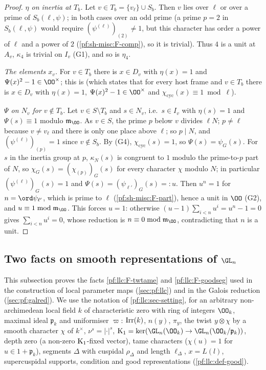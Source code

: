 \begin{proof}
\emph{$\eta$ on inertia at $T_b$.} Let $v\in T_b=\{v_\ell\}\cup S_b$. Then $v$ lies over $\ell$ or over a prime of $S_b(\ell,\psi)$; in both cases
over an odd prime (a prime $p=2$ in $S_b(\ell,\psi)$ would require $(\psi^{(\ell)})_{(2)}\ne1$, but this character has order a power of
$\ell$ and a power of $2$ (\ref{pf:sh-misc:F-comp}), so it is trivial). Thus $4$ is a unit at $A_v$, $\kappa_4$ is trivial on $I_v$ (G1),
and so is $\eta_4$.

\emph{The elements $x_v$.} For $v\in T_b$ there is $x\in D_v$ with $\eta(x)=1$ and $\Psi(x)^2-1\in\OO^\times$; this is
 (which states that for every host frame and $v\in T_b$ there is $x\in D_v$ with
$\eta(x)=1$, $\Psi(x)^2-1\in\OO^\times$ and $\chi_{\mathrm{cyc}}(x)\equiv1\bmod\ell$).

\emph{$\Psi$ on $N_v$ for $v\notin T_b$.} Let $v\in S\setminus T_b$ and $s\in N_v$, i.e.\ $s\in I_v$ with $\eta(s)=1$ and $\Psi(s)\equiv1$ modulo
$\mathfrak m_\OO$. As $v\in S$, the prime $p$ below $v$ divides $\ell N$; $p\ne\ell$ because $v\ne v_\ell$ and there is only one place above $\ell$;
so $p\mid N$, and $(\psi^{(\ell)})_{(p)}=1$ since $v\notin S_b$. By (G4), $\chi_{\mathrm{cyc}}(s)=1$, so $\Psi(s)=\psi_G(s)$. For $s$ in the inertia
group at $p$, $\kappa_N(s)$ is congruent to $1$ modulo the prime-to-$p$ part of $N$, so $\chi_G(s)=(\chi_{(p)})_G(s)$ for every character $\chi$
modulo $N$; in particular $(\psi^{(\ell)})_G(s)=1$ and $\Psi(s)=(\psi_{\ell'})_G(s)=:u$. Then $u^n=1$ for $n=\ord\psi_{\ell'}$, which is prime to
$\ell$ (\ref{pf:sh-misc:F-part}), hence a unit in $\OO$ (G2), and $u\equiv1\bmod\mathfrak m_\OO$. This forces $u=1$: otherwise
$(u-1)\sum_{i<n}u^i=u^n-1=0$ gives $\sum_{i<n}u^i=0$, whose reduction is $n\equiv0\bmod\mathfrak m_\OO$, contradicting that $n$ is a unit.
\end{proof}

\subsection{Two facts on smooth representations of \texorpdfstring{$\GL_n$}{GLn}}\label{sec:pf:sh-misc:llc}

This subsection proves the facts \ref{pf:llc:F-twtame} and \ref{pf:llc:F-goodseg} used in the construction of local parameter maps
(\cref{sec:pf:llc}) and in the Galois reduction (\cref{sec:pf:galred}). We use the notation of \cref{pf:llc:sec-setting}, for an
arbitrary non-archimedean local field $k$ of characteristic zero with ring of integers $\OO_k$, maximal ideal $\mathfrak p_k$ and
uniformiser $\varpi$: $\operatorname{Irr}(k)$, $n(y)$, $\pi_y$, the twist $y\otimes\chi$ by a smooth character $\chi$ of $k^\times$, $\nu^s=|\cdot|^s$,
$\shmiscKone=\ker(\GL_n(\OO_k)\to\GL_n(\OO_k/\mathfrak p_k))$, depth zero (a non-zero $\mathrm{K}_1$-fixed vector), tame characters ($\chi(u)=1$ for
$u\in1+\mathfrak p_k$), segments $\Delta$ with cuspidal $\rho_\Delta$ and length $\ell_\Delta$, $x=L(l)$, supercuspidal supports, condition
\shmiscGo{} and good representations (\cref{pf:llc:def-good}).

